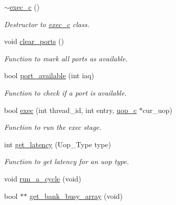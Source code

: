\begin{DoxyCompactItemize}
\item 
\hyperlink{classexec__c_ac153272a81873b7a8ec5c9a992b9c15a}{$\sim$exec\_\-c} ()
\begin{DoxyCompactList}\small\item\em Destructor to \hyperlink{classexec__c}{exec\_\-c} class. \item\end{DoxyCompactList}\item 
void \hyperlink{classexec__c_ac31a0c7eeb4e765266713509e1f9dce6}{clear\_\-ports} ()
\begin{DoxyCompactList}\small\item\em Function to mark all ports as available. \item\end{DoxyCompactList}\item 
bool \hyperlink{classexec__c_a7e44fb61247ac3453653343797227dad}{port\_\-available} (int iaq)
\begin{DoxyCompactList}\small\item\em Function to check if a port is available. \item\end{DoxyCompactList}\item 
bool \hyperlink{classexec__c_a0a29cacd39be2ef77c8e3ea15edefa8d}{exec} (int thread\_\-id, int entry, \hyperlink{classuop__c}{uop\_\-c} $\ast$cur\_\-uop)
\begin{DoxyCompactList}\small\item\em Function to run the exec stage. \item\end{DoxyCompactList}\item 
int \hyperlink{classexec__c_a4119c1228dcc21de9d46309187eaeade}{get\_\-latency} (Uop\_\-Type type)
\begin{DoxyCompactList}\small\item\em Function to get latency for an uop type. \item\end{DoxyCompactList}\item 
void \hyperlink{classexec__c_ae839174d0a61b71e17655b82ecf9d63f}{run\_\-a\_\-cycle} (void)
\item 
bool $\ast$$\ast$ \hyperlink{classexec__c_ad3b78e2f43775bde67aeb3f15aa76a89}{get\_\-bank\_\-busy\_\-array} (void)
\end{DoxyCompactItemize}

